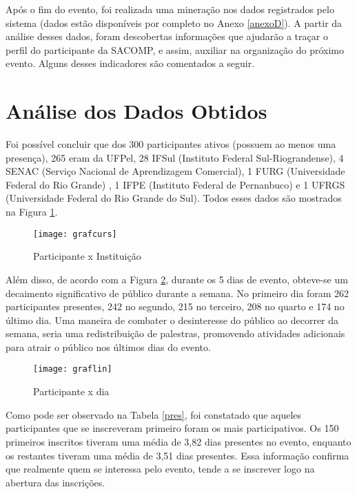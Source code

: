 \documentclass[tcc,capa]{texufpel}
\begin{document}
            
            Após o fim do evento, foi realizada uma mineração nos dados registrados pelo sistema (dados estão disponíveis por completo no Anexo \ref{anexoD}). A partir da análise desses dados, foram descobertas informações que ajudarão a  traçar o perfil do participante da SACOMP, e assim, auxiliar na organização do próximo evento. Alguns desses indicadores são comentados a seguir.
            
     \section{Análise dos Dados Obtidos}
            Foi possível concluir que dos 300 participantes ativos (possuem ao menos uma presença), 265 eram da UFPel, 28 IFSul (Instituto Federal Sul-Riograndense), 4 SENAC (Serviço Nacional de Aprendizagem Comercial), 1 FURG (Universidade Federal do Rio Grande) , 1 IFPE (Instituto Federal de Pernanbuco) e 1 UFRGS (Universidade Federal do Rio Grande do Sul). Todos esses dados são mostrados na Figura \ref{grafpar}.
            
            \begin{figure}[H]
                \centering \texttt{[image: grafcurs]}
                \caption{Participante x Instituição} 
                \label{grafpar}
            \end{figure}
            
            Além disso, de acordo com a Figura \ref{pardia}, durante os 5 dias de evento, obteve-se um decaimento significativo de público durante a semana. No primeiro dia foram 262 participantes presentes, 242 no segundo, 215 no terceiro, 208 no quarto e 174 no último dia. Uma maneira de combater o desinteresse do público ao decorrer da semana, seria uma redistribuição de palestras, promovendo atividades adicionais para atrair o público nos últimos dias do evento.
            
            \begin{figure}[H]
                \centering \texttt{[image: graflin]}
                \caption{Participante x dia } 
                \label{pardia}
            \end{figure}
            
            Como pode ser observado na Tabela \ref{pres}, foi constatado que aqueles participantes que se inscreveram primeiro foram os mais participativos. Os 150 primeiros inscritos tiveram uma média de 3,82 dias presentes no evento, enquanto os restantes tiveram uma média de 3,51 dias presentes. Essa informação confirma que realmente quem se interessa pelo evento, tende a se inscrever logo na abertura das inscrições.
            
\end{document}
